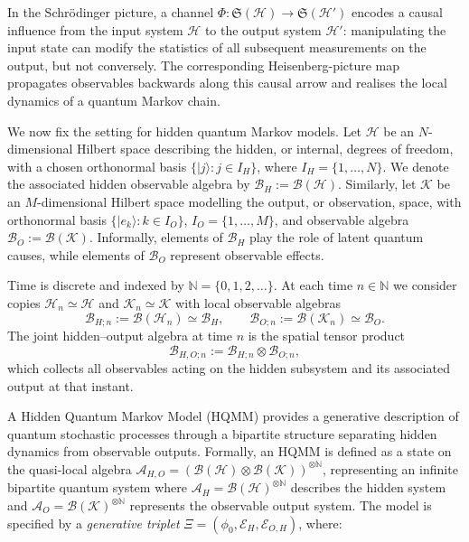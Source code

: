 \documentclass[11pt,a4paper]{article}
\begin{document}
In the Schr\"odinger picture, a channel
$\Phi:\mathfrak{S}(\mathcal{H})\to\mathfrak{S}(\mathcal{H}')$ encodes a causal influence
from the input system $\mathcal{H}$ to the output system $\mathcal{H}'$: manipulating
the input state can modify the statistics of all subsequent measurements on the
output, but not conversely.
The corresponding Heisenberg-picture map propagates observables backwards
along this causal arrow and realises the local dynamics of a quantum Markov chain.

We now fix the setting for hidden quantum Markov models.
Let $\mathcal{H}$ be an $N$-dimensional Hilbert space describing the hidden, or
internal, degrees of freedom, with a chosen orthonormal basis
$\{|j\rangle : j\in I_{H}\}$, where $I_{H}=\{1,\dots,N\}$.
We denote the associated hidden observable algebra by
\(\mathcal{B}_{H} := \mathcal{B}(\mathcal{H}).\)
Similarly, let $\mathcal{K}$ be an $M$-dimensional Hilbert space modelling the
output, or observation, space, with orthonormal basis
$\{|e_{k}\rangle : k\in I_{O}\}$, $I_{O}=\{1,\dots,M\}$, and observable algebra
\(\mathcal{B}_{O} := \mathcal{B}(\mathcal{K}).\)
Informally, elements of $\mathcal{B}_{H}$ play the role of latent quantum
causes, while elements of $\mathcal{B}_{O}$ represent observable effects.

Time is discrete and indexed by $\mathbb{N}=\{0,1,2,\dots\}$.
At each time $n\in\mathbb{N}$ we consider copies
$\mathcal{H}_{n}\simeq\mathcal{H}$ and $\mathcal{K}_{n}\simeq\mathcal{K}$ with
local observable algebras
\[
\mathcal{B}_{H;n} := \mathcal{B}(\mathcal{H}_{n})\simeq\mathcal{B}_{H},
\qquad
\mathcal{B}_{O;n} := \mathcal{B}(\mathcal{K}_{n})\simeq\mathcal{B}_{O}.
\]
The joint hidden–output algebra at time $n$ is the spatial tensor product
\[
\mathcal{B}_{H,O;n} := \mathcal{B}_{H;n}\otimes\mathcal{B}_{O;n},
\]
which collects all observables acting on the hidden subsystem and its
associated output at that instant.


A Hidden Quantum Markov Model (HQMM) provides a generative description of quantum stochastic processes through a bipartite structure separating hidden dynamics from observable outputs. Formally, an HQMM is defined as a state on the quasi-local algebra $\mathcal{A}_{H,O} = (\mathcal{B}(\mathcal{H}) \otimes \mathcal{B}(\mathcal{K}))^{\otimes \mathbb{N}}$, representing an infinite bipartite quantum system where $\mathcal{A}_{H} = \mathcal{B}(\mathcal{H})^{\otimes \mathbb{N}}$ describes the hidden system and $\mathcal{A}_{O} = \mathcal{B}(\mathcal{K})^{\otimes \mathbb{N}}$ represents the observable output system. The model is specified by a \emph{generative triplet} $\Xi = (\phi_0, \mathcal{E}_H, \mathcal{E}_{O,H})$, where:
\end{document}
